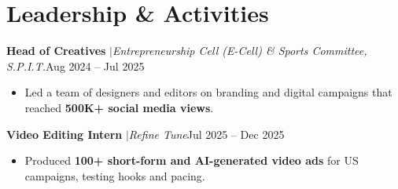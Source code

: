 \documentclass[a4paper,10pt]{article}
\newcommand{\entrygap}{\vspace{4pt}}
\newcommand{\sep}{\unskip\hspace{0.5em}$|$\hspace{0.5em}\ignorespaces}
\newlength{\entryindent}\setlength{\entryindent}{10pt}
\newcommand{\entry}[2]{\hspace*{\entryindent}#1\hfill #2\par}
\begin{document}

\section*{Leadership \& Activities}

\entry{\textbf{Head of Creatives} \sep \textit{Entrepreneurship Cell (E-Cell) \& Sports Committee, S.P.I.T.}}{Aug 2024 -- Jul 2025}
\begin{itemize}
    \item Led a team of designers and editors on branding and digital campaigns that reached \textbf{500K+ social media views}.
\end{itemize}
\entrygap
\entry{\textbf{Video Editing Intern} \sep \textit{Refine Tune}}{Jul 2025 -- Dec 2025}
\begin{itemize}
    \item Produced \textbf{100+ short-form and AI-generated video ads} for US campaigns, testing hooks and pacing.
\end{itemize}
\end{document}
